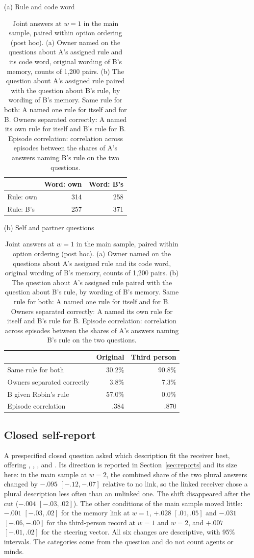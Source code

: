 \begin{table}[htbp]
\centering\small
\caption{Joint answers at $w=1$ in the main sample, paired within option
ordering (post hoc). (a) Owner named on the questions about A's assigned
rule and its code word, original wording of B's memory, counts of
1,200 pairs. (b) The question about A's assigned rule paired with the
question about B's rule, by wording of B's memory. Same rule for both:
A named one rule for itself and for B. Owners separated correctly: A
named its own rule for itself and B's rule for B. Episode correlation:
correlation across episodes between the shares of A's answers naming
B's rule on the two questions.}
\label{tab:joint}
\begin{minipage}[t]{0.4\linewidth}\centering
(a) Rule and code word\\[3pt]
\begin{tabular}{@{}lrr@{}}
\toprule
& Word: own & Word: B's \\
\midrule
Rule: own & 314 & 258 \\
Rule: B's & 257 & 371 \\
\bottomrule
\end{tabular}
\end{minipage}\hfill
\begin{minipage}[t]{0.55\linewidth}\centering
(b) Self and partner questions\\[3pt]
\begin{tabular}{@{}lrr@{}}
\toprule
& Original & Third person \\
\midrule
Same rule for both & 30.2\% & 90.8\% \\
Owners separated correctly & 3.8\% & 7.3\% \\
B given Robin's rule & 57.0\% & 0.0\% \\
Episode correlation & .384 & .870 \\
\bottomrule
\end{tabular}
\end{minipage}
\end{table}

\subsection{Closed self-report}

A prespecified closed question asked which description fit the receiver
best, offering , , , and . Its direction is reported in Section~\ref{sec:reports} and its size
here: in the main sample at $w=2$, the combined share of the two plural
answers changed by $-.095$ $[-.12,-.07]$ relative to no link, so the linked
receiver chose a plural description less often than an unlinked one. The
shift disappeared after the cut ($-.004$ $[-.03,.02]$). The other conditions
of the main sample moved little: $-.001$ $[-.03,.02]$ for the memory link
at $w=1$, $+.028$ $[.01,.05]$ and $-.031$ $[-.06,-.00]$ for the
third-person record at $w=1$ and $w=2$, and $+.007$ $[-.01,.02]$ for the
steering vector. All six changes are descriptive, with 95\% intervals.
The categories come from the question and do not count agents or minds.
